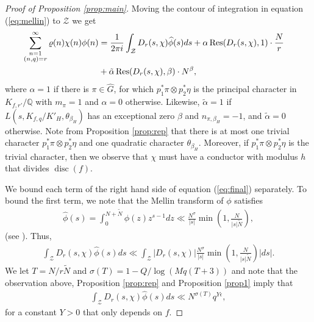 \documentclass[12pt]{amsart}
\def\Q{{\mathbb Q}}
\def\\{\cr}
\def\({\left(}
\begin{document}
\begin{proof}[Proof of Proposition \ref{prop:main}]
Moving the contour of integration in equation (\ref{eq:mellin}) to $\mathcal{Z}$ we get
\begin{equation}
\label{eq:final}
\begin{split}
\sum_{\substack{n=1\\(n,q)=r}}^{\infty}\varrho(n)\chi(n)\phi(n) & = \frac{1}{2\pi i}\int_{\mathcal{Z}}D_r(s,\chi) \widehat{\phi}(s)ds +\alpha \operatorname{Res}(D_r(s,\chi), 1) \cdot \frac{N}{r} \\
& + \tilde{\alpha}\operatorname{Res}(D_r(s,\chi), \beta) \cdot N^\beta , \\
\end{split}
\end{equation}
where $\alpha=1$ if there is $\pi \in \hat{G}$, for which  $p_1^\ast \pi \otimes p_2^\ast \eta$ is the principal character in $K_{f,r'}/\Q$ with $m_\pi = 1 $ and $\alpha = 0$ otherwise.  Likewise,  $\tilde{\alpha}=1$ if $ L(s, K_{f,q} /K'_H, \theta_{\beta_H})$ has an exceptional zero $\beta$  and $n_{\pi, \beta_H} = -1$, and $\tilde{\alpha} = 0$ otherwise.  Note from Proposition \ref{prop:rep} that there is at most one trivial character $p_1^\ast \pi \otimes p_2^\ast \eta$ and one quadratic character $\theta_{\beta_H}$.  Moreover, if $p_1^\ast \pi \otimes p_2^\ast \eta$ is the trivial character, then we observe that $\chi$ must have a conductor with modulus $h$ that divides $\operatorname{disc}(f)$.


 We bound each term of the right hand side of equation (\ref{eq:final}) separately. 
To bound the first term, we note that the Mellin transform of $\phi$ satisfies 
\begin{align*}
\widehat{\phi}(s) = \int_{0}^{N+\tilde{N}} \phi(z) z^{s-1}dz \ll \frac{N^{\sigma}}{|s|} \min\left( 1 , \frac{N}{|s|\tilde{N}}\right),
\end{align*}
(see \cite[Theorem 5.12]{I-K}). Thus, 
\begin{align*}
\int_{\mathcal{Z}} D_r(s,\chi) \hat{\phi}(s)ds \ll \int_{\mathcal{Z}} | D_r(s,\chi)|\frac{N^{\sigma}}{|s|} \min\left( 1 , \frac{N}{|s|\tilde{N}}\right) |ds|.
\end{align*}
We let $T= N/r\tilde{N}$ and $\sigma(T) = 1 - Q/\log(Mq(T+3))$ and note that the observation above,  Proposition \ref{prop:rep} and 
Proposition \ref{prop1} imply that
\begin{align*}
\int_{\mathcal{Z}} D_r(s,\chi) \hat{\phi}(s)ds \ll N^{\sigma(T)}q^{Y\epsilon},
\end{align*}
for a constant $Y>0$ that only depends on $f$.


\end{proof}
\end{document}
